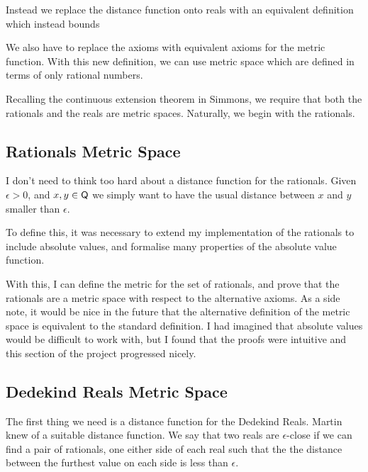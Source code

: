 \documentclass[ProjectReport]{subfiles}
\begin{document}
Instead we replace the distance function onto reals with an equivalent definition which instead bounds %

We also have to replace the axioms with equivalent axioms for the metric function. With this new definition, we can use metric space which are defined in terms of only rational numbers. 



Recalling the continuous extension theorem in Simmons, we require that both the rationals and the reals are metric spaces. Naturally, we begin with the rationals. 

\subsection{Rationals Metric Space}

I don't need to think too hard about a distance function for the rationals. Given $\epsilon > 0$, and $x , y \in \AgdaFunction{Q}$ we simply want to have the usual distance between $x$ and $y$ smaller than $\epsilon$. 

To define this, it was necessary to extend my implementation of the rationals to include absolute values, and formalise many properties of the absolute value function. 


With this, I can define the metric for the set of rationals, and prove that the rationals are a metric space with respect to the alternative axioms. As a side note, it would be nice in the future that the alternative definition of the metric space is equivalent to the standard definition. I had imagined that absolute values would be difficult to work with, but I found that the proofs were intuitive and this section of the project progressed nicely.

\subsection{Dedekind Reals Metric Space}

The first thing we need is a distance function for the Dedekind Reals. Martin knew of a suitable distance function. We say that two reals are $\epsilon$-close if we can find a pair of rationals, one either side of each real such that the the distance between the furthest value on each side is less than $\epsilon$. 
\end{document}

